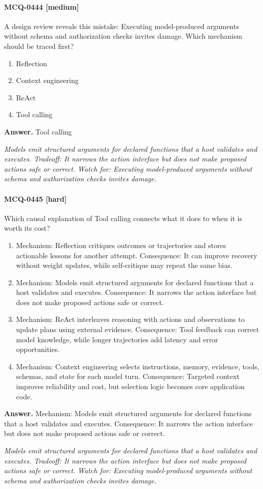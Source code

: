 \paragraph{MCQ-0444 [medium]} A design review reveals this mistake: Executing model-produced arguments without schema and authorization checks invites damage. Which mechanism should be traced first?
\begin{enumerate}[label=\Alph*.]
\item Reflection
\item Context engineering
\item ReAct
\item Tool calling
\end{enumerate}
\noindent\textbf{Answer.} Tool calling
\par\textit{Models emit structured arguments for declared functions that a host validates and executes. Tradeoff: It narrows the action interface but does not make proposed actions safe or correct. Watch for: Executing model-produced arguments without schema and authorization checks invites damage.}
\paragraph{MCQ-0445 [hard]} Which causal explanation of Tool calling connects what it does to when it is worth its cost?
\begin{enumerate}[label=\Alph*.]
\item Mechanism: Reflection critiques outcomes or trajectories and stores actionable lessons for another attempt. Consequence: It can improve recovery without weight updates, while self-critique may repeat the same bias.
\item Mechanism: Models emit structured arguments for declared functions that a host validates and executes. Consequence: It narrows the action interface but does not make proposed actions safe or correct.
\item Mechanism: ReAct interleaves reasoning with actions and observations to update plans using external evidence. Consequence: Tool feedback can correct model knowledge, while longer trajectories add latency and error opportunities.
\item Mechanism: Context engineering selects instructions, memory, evidence, tools, schemas, and state for each model turn. Consequence: Targeted context improves reliability and cost, but selection logic becomes core application code.
\end{enumerate}
\noindent\textbf{Answer.} Mechanism: Models emit structured arguments for declared functions that a host validates and executes. Consequence: It narrows the action interface but does not make proposed actions safe or correct.
\par\textit{Models emit structured arguments for declared functions that a host validates and executes. Tradeoff: It narrows the action interface but does not make proposed actions safe or correct. Watch for: Executing model-produced arguments without schema and authorization checks invites damage.}
